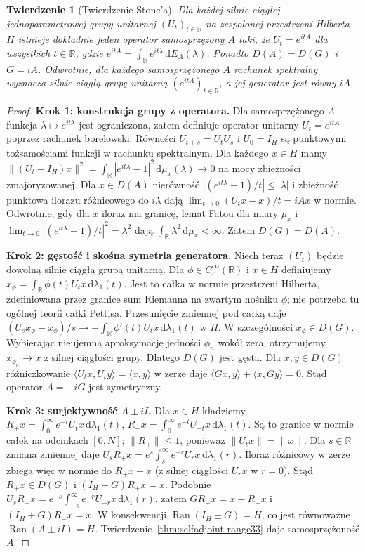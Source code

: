 \documentclass[11pt,a4paper]{article}
\numberwithin{equation}{section}
\theoremstyle{plain}
\newtheorem{twierdzenie}{Twierdzenie}[section]
\theoremstyle{definition}
\theoremstyle{remark}
\newcommand{\R}{\mathbb R}
\begin{document}
\begin{twierdzenie}[Twierdzenie Stone'a]
\label{thm:stone33}
Dla każdej silnie ciągłej jednoparametrowej grupy unitarnej
$(U_t)_{t\in\R}$ na zespolonej przestrzeni Hilberta $H$
istnieje dokładnie jeden operator samosprzężony $A$ taki, że
$U_t=e^{itA}$ dla wszystkich $t\in\R$, gdzie
$e^{itA}=\int_\R e^{it\lambda}\,\mathrm dE_A(\lambda)$.
Ponadto $D(A)=D(G)$ i $G=iA$.
Odwrotnie, dla każdego samosprzężonego $A$ rachunek spektralny
wyznacza silnie ciągłą grupę unitarną $(e^{itA})_{t\in\R}$,
a jej generator jest równy $iA$.
\end{twierdzenie}
\begin{proof}
\textbf{Krok 1: konstrukcja grupy z operatora.}
Dla samosprzężonego $A$ funkcja $\lambda\mapsto e^{it\lambda}$
jest ograniczona, zatem definiuje operator unitarny
$U_t=e^{itA}$ poprzez rachunek borelowski.
Równości $U_{t+s}=U_tU_s$ i $U_0=I_H$ są punktowymi
tożsamościami funkcji w rachunku spektralnym.
Dla każdego $x\in H$ mamy
$\|(U_t-I_H)x\|^2=\int_\R|e^{it\lambda}-1|^2\,\mathrm d\mu_x(\lambda)
\to0$ na mocy zbieżności zmajoryzowanej.
Dla $x\in D(A)$ nierówność
$|(e^{it\lambda}-1)/t|\le|\lambda|$ i zbieżność punktowa
ilorazu różnicowego do $i\lambda$ dają
$\lim_{t\to0}(U_tx-x)/t=iAx$ w normie.
Odwrotnie, gdy dla $x$ iloraz ma granicę, lemat Fatou
dla miary $\mu_x$ i
$\lim_{t\to0}|(e^{it\lambda}-1)/t|^2=\lambda^2$
dają $\int_\R\lambda^2\,\mathrm d\mu_x<\infty$.
Zatem $D(G)=D(A)$.

\textbf{Krok 2: gęstość i skośna symetria generatora.}
Niech teraz $(U_t)$ będzie dowolną silnie ciągłą grupą unitarną.
Dla $\phi\in C_c^\infty(\R)$ i $x\in H$ definiujemy
$x_\phi=\int_\R\phi(t)U_tx\,\mathrm d\lambda_1(t)$.
Jest to całka w normie przestrzeni Hilberta, zdefiniowana
przez granice sum Riemanna na zwartym nośniku $\phi$;
nie potrzeba tu ogólnej teorii całki Pettisa.
Przesunięcie zmiennej pod całką daje
$(U_sx_\phi-x_\phi)/s\to
-\int_\R\phi'(t)U_tx\,\mathrm d\lambda_1(t)$ w $H$.
W szczególności $x_\phi\in D(G)$. Wybierając
nieujemną aproksymację jedności $\phi_n$ wokół zera,
otrzymujemy $x_{\phi_n}\to x$ z silnej ciągłości grupy.
Dlatego $D(G)$ jest gęsta.
Dla $x,y\in D(G)$ różniczkowanie
$\langle U_tx,U_ty\rangle=\langle x,y\rangle$ w zerze daje
$\langle Gx,y\rangle+\langle x,Gy\rangle=0$.
Stąd operator $A=-iG$ jest symetryczny.

\textbf{Krok 3: surjektywność $A\pm iI$.}
Dla $x\in H$ kładziemy
$R_+x=\int_0^\infty e^{-t}U_tx\,\mathrm d\lambda_1(t)$,
$R_-x=\int_0^\infty e^{-t}U_{-t}x\,\mathrm d\lambda_1(t)$.
Są to granice w normie całek na odcinkach $[0,N]$;
$\|R_\pm\|\le1$, ponieważ $\|U_tx\|=\|x\|$.
Dla $s\in\R$ zmiana zmiennej daje
$U_sR_+x=e^s\int_s^\infty e^{-r}U_rx\,\mathrm d\lambda_1(r)$.
Iloraz różnicowy w zerze zbiega więc w normie do
$R_+x-x$ (z silnej ciągłości $U_rx$ w $r=0$).
Stąd $R_+x\in D(G)$ i $(I_H-G)R_+x=x$.
Podobnie
$U_sR_-x=e^{-s}\int_{-s}^\infty e^{-r}U_{-r}x\,\mathrm d\lambda_1(r)$,
zatem $GR_-x=x-R_-x$ i $(I_H+G)R_-x=x$.
W konsekwencji
$\operatorname{Ran}(I_H\pm G)=H$, co jest równoważne
$\operatorname{Ran}(A\pm iI)=H$.
Twierdzenie~\ref{thm:selfadjoint-range33} daje samosprzężoność $A$.


\end{proof}
\end{document}
